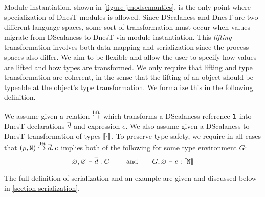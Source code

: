 Module instantiation, shown in \autoref{figure-jmodsemantics}, is the only point where
specialization of DnesT modules is allowed.
Since DScalaness and DnesT are two different language spaces, some sort of transformation must
occur when values migrate from DScalaness to DnesT via module instantiation. This \emph{lifting}
transformation involves both data mapping and serialization since the process spaces also
differ. We aim to be flexible and allow the user to specify how values are lifted and how types
are transformed. We only require that lifting and type transformation are coherent, in the sense
that the lifting of an object should be typeable at the object's type transformation. We
formalize this in the following definition.%
\begin{definition}
\label{def-lifting}
We assume given a relation $\ser{\jstore}$ which transforms a DScalaness reference $\tt{l}$ into
DnesT declarations $\vect{d}$ and expression $e$. We also assume given a DScalaness-to-DnesT
transformation of types $\codt{\cdot}$. To preserve type safety, we require in all cases that
$\jref{p}{N} \ser{\jstore} \vect{d}, e$ implies both of the following for some type environment
$G$:
$$
\varnothing, \varnothing \vdash \vect{d} : \tenv \qquad \text{ and} \qquad
 \tenv, \varnothing \vdash e : \codt{\tt{N}} 
$$
\end{definition}
The full definition of serialization and an example are given and discussed below in
\autoref{section-serialization}.

\jmodsemanticsfig

